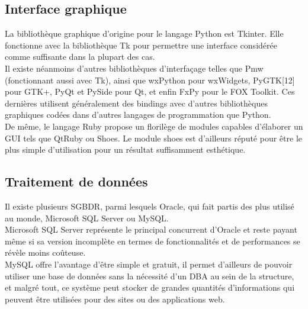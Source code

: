 \documentclass[a4paper]{report}
\begin{document}
\subsection{Interface graphique}

	La bibliothèque graphique d'origine pour le langage Python est Tkinter\cite{ref7}. Elle fonctionne avec la bibliothèque Tk\cite{ref8} pour permettre une interface considérée comme suffisante dans la plupart des cas. \\
	
	Il existe néanmoins d'autres bibliothèques d'interfaçage telles que Pmw\cite{ref9} (fonctionnant aussi avec Tk), ainsi que wxPython\cite{ref10} pour wxWidgets\cite{ref11}, PyGTK[12] pour GTK+\cite{ref13}, PyQt\cite{ref14} et PySide\cite{ref15} pour Qt\cite{ref16}, et enfin FxPy\cite{ref17} pour le FOX Toolkit\cite{ref18}. Ces dernières utilisent généralement des bindings avec d'autres bibliothèques graphiques codées dans d'autres langages de programmation que Python. \\

	De même, le langage Ruby\cite{ref28} propose un florilège de modules capables d'élaborer un GUI tels que QtRuby\cite{ref29} ou Shoes\cite{ref30}. Le module shoes est d’ailleurs réputé pour être le plus simple d'utilisation pour un résultat suffisamment esthétique.


\subsection{Traitement de données}

Il existe plusieurs SGBDR, parmi lesquels Oracle\cite{ref20}, qui fait partis des plus utilisé au monde, Microsoft SQL Server\cite{ref22} ou MySQL\cite{ref31}. \\

Microsoft SQL Server représente le principal concurrent d’Oracle et reste payant même si sa version incomplète en termes de fonctionnalités et de performances se révèle moins coûteuse. \\

MySQL offre l'avantage d'être simple et gratuit, il permet d'ailleurs de pouvoir utiliser une base de données sans la nécessité d'un DBA au sein de la structure, et malgré tout, ce système peut stocker de grandes quantités d'informations qui peuvent être utilisées pour des sites ou des applications web. \\
\end{document}

